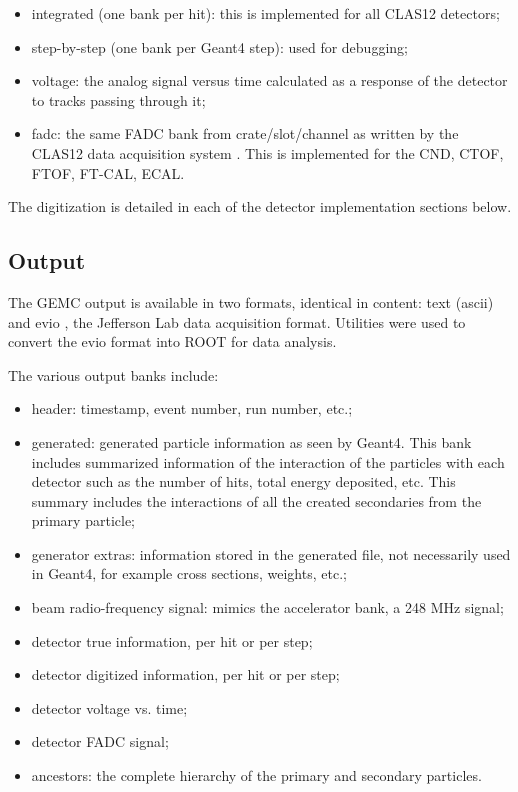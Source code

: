 \begin{itemize}
	\item integrated (one bank per hit): this is implemented for all CLAS12 detectors;
	\item step-by-step (one bank per Geant4 step): used for debugging;
	\item voltage: the analog signal versus time calculated as a response of the detector to tracks passing through it;
	\item fadc: the same FADC bank from crate/slot/channel as written by the CLAS12 data acquisition system \cite{daq-nim}.
          This is implemented for the CND, CTOF, FTOF, FT-CAL, ECAL.
\end{itemize}


The digitization is detailed in each of the detector implementation sections below.


\subsection{Output}

The GEMC output is available in two formats, identical in content: text (ascii) and evio \cite{evio}, the Jefferson Lab
data acquisition format.
Utilities were used to convert the evio format into ROOT \cite{root} for data analysis.

The various output banks include:

\begin{itemize}
	\item header: timestamp, event number, run number, etc.;
	\item generated: generated particle information as seen by Geant4. This bank includes summarized information of the interaction of
                     the particles with each detector such as the number of hits, total energy deposited, etc. This summary includes
                     the interactions of all the created secondaries from the primary particle;
	\item generator extras: information stored in the generated file, not necessarily used in Geant4, for example cross sections, weights, etc.;
	\item beam radio-frequency signal: mimics the accelerator bank, a 248 MHz signal;
	\item detector true information, per hit or per step;
	\item detector digitized information, per hit or per step;
	\item detector voltage vs. time;
	\item detector FADC signal;
	\item ancestors: the complete hierarchy of the primary and secondary particles.
\end{itemize}

